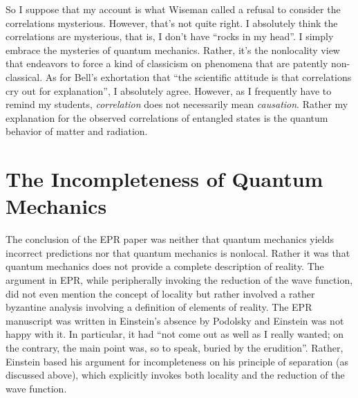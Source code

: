 \documentclass[12pt]{article}
\begin{document}
So I suppose that my account is what Wiseman called a refusal to consider the correlations mysterious.  However, that's not quite right.  I absolutely think the correlations are mysterious, that is, I don't have ``rocks in my head''.  I simply embrace the mysteries of quantum mechanics.  Rather, it's the nonlocality view that endeavors to force a kind of classicism on phenomena that are patently non-classical.  As for Bell's exhortation that ``the scientific attitude is that correlations cry out for explanation'', I absolutely agree.  However, as I frequently have to remind my students, {\it correlation} does not necessarily mean {\it causation}.  Rather my explanation for the observed correlations of entangled states is the quantum behavior of matter and radiation.

\section{The Incompleteness of Quantum Mechanics} \label{IQM}

The conclusion of the EPR paper was neither that quantum mechanics yields incorrect predictions nor that quantum mechanics is nonlocal.  Rather it was that quantum mechanics does not provide a complete description of reality. The argument in EPR, while peripherally invoking the reduction of the wave function, did not even mention the concept of locality but rather involved a rather byzantine analysis involving a definition of elements of reality. The EPR manuscript was written in Einstein's absence by Podolsky and Einstein was not happy with it.  In particular, it had ``not come out as well as I really wanted; on the contrary, the main point was, so to speak, buried by the erudition''\cite{How07}.  Rather, Einstein based his argument for incompleteness on his principle of separation (as discussed above), which explicitly invokes both locality and the reduction of the wave function.
\end{document}
